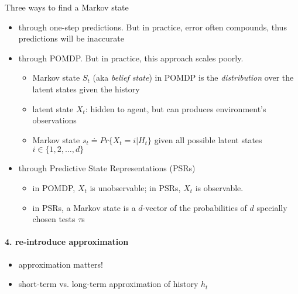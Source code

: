 \documentclass[sutton_barto_notes.tex]{subfiles}
\begin{document}
Three ways to find a Markov state
\begin{itemize}
\item through one-step predictions. But in practice, error often compounds, thus predictions will be inaccurate
\item through POMDP. But in practice, this approach scales poorly.
\begin{itemize}
	\item Markov state $S_t$ (aka \textit{belief state}) in POMDP is the \textit{distribution} over the latent states given the history
	\item latent state $X_t$: hidden to agent, but can produces environment's observations
	\item Markov state $s_t \doteq Pr\{ X_t = i | H_t \}$ given all possible latent states $i \in \{1,2,\dots,d\}$
\end{itemize}
\item through Predictive State Representations (PSRs)
\begin{itemize}
	\item in POMDP, $X_t$ is unobservable; in PSRs, $X_t$ is observable.
	\item in PSRs, a Markov state is a $d$-vector of the probabilities of $d$ specially chosen tests $\tau$s
\end{itemize}
\end{itemize}

\paragraph{4. re-introduce approximation}

\begin{itemize}
\item approximation matters!
\item short-term vs. long-term approximation of history $h_t$
\end{itemize}
\end{document}
